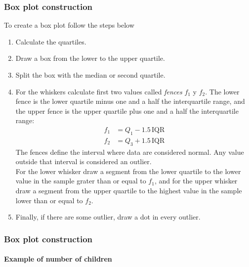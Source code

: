 \begin{frame}
\frametitle{Box plot construction}
To create a box plot follow the steps below
\begin{enumerate}
\item Calculate the quartiles. 
\item Draw a box from the lower to the upper quartile. 
\item Split the box with the median or second quartile. 
\item For the whiskers calculate first two values called \emph{fences} $f_1$ y $f_2$. The lower fence is the
lower quartile minus one and a half the interquartile range, and the upper fence is the upper quartile plus one and a
half the interquartile range:
\begin{align*}
f_1&=Q_1-1.5\,\text{IQR}\\
f_2&=Q_3+1.5\,\text{IQR}
\end{align*}
The fences define the interval where data are considered normal.
Any value outside that interval is considered an outlier. \\ 
For the lower whisker draw a segment from the lower quartile to the lower value in the sample grater than or
equal to $f_1$, and for the upper whisker draw a segment from the upper quartile to the highest value in the sample lower than
or equal to $f_2$.
\item Finally, if there are some outlier, draw a dot in every outlier. 
\end{enumerate}
\end{frame}


\begin{frame}
\frametitle{Box plot construction}
\framesubtitle{Example of number of children}
\begin{enumerate}
 
 
\end{enumerate}
\begin{center}
\scalebox{0.45}{}
\end{center}
\end{frame}


